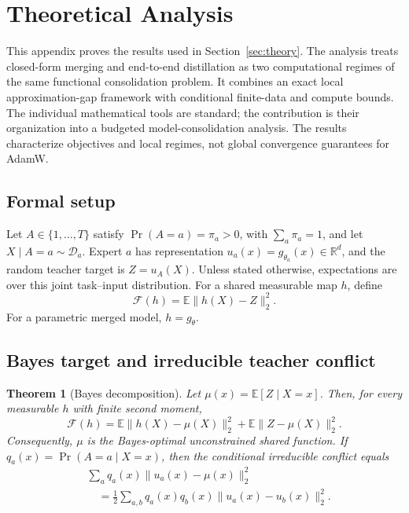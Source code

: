 \documentclass[letterpaper]{article} %
\theoremstyle{plain}
\newtheorem{theorem}{Theorem}
\theoremstyle{definition}
\begin{document}
\section{Theoretical Analysis}
\label{app:theory}

This appendix proves the results used in Section~\ref{sec:theory}. The analysis treats
closed-form merging and end-to-end distillation as two computational regimes of the same
functional consolidation problem. It combines an exact local approximation-gap framework
with conditional finite-data and compute bounds. The individual mathematical tools are
standard; the contribution is their organization into a budgeted model-consolidation
analysis. The results characterize objectives and local regimes, not global convergence
guarantees for AdamW.

\subsection{Formal setup}
Let $A\in\{1,\ldots,T\}$ satisfy $\Pr(A=a)=\pi_a>0$, with
$\sum_a\pi_a=1$, and let $X\mid A=a\sim\mathcal D_a$. Expert $a$ has
representation $u_a(x)=g_{\theta_a}(x)\in\mathbb R^d$, and the random teacher target is
$Z=u_A(X)$. Unless stated otherwise, expectations are over this joint task--input
distribution. For a shared measurable map $h$, define
\begin{equation}
    \mathcal F(h)=\mathbb E\|h(X)-Z\|_2^2.
    \label{eq:appendix-F}
\end{equation}
For a parametric merged model, $h=g_\theta$.

\subsection{Bayes target and irreducible teacher conflict}
\label{app:bayes}

\begin{theorem}[Bayes decomposition]
\label{thm:bayes}
Let $\mu(x)=\mathbb E[Z\mid X=x]$. Then, for every measurable $h$ with finite second
moment,
\begin{equation}
\mathcal F(h)=
\mathbb E\|h(X)-\mu(X)\|_2^2
+\mathbb E\|Z-\mu(X)\|_2^2.
\label{eq:bayes-decomposition}
\end{equation}
Consequently, $\mu$ is the Bayes-optimal unconstrained shared function. If
$q_a(x)=\Pr(A=a\mid X=x)$, then the conditional irreducible conflict equals
\begin{equation}
\begin{aligned}
&\sum_a q_a(x)\|u_a(x)-\mu(x)\|_2^2 \\
&\quad=\frac12\sum_{a,b}q_a(x)q_b(x)
\|u_a(x)-u_b(x)\|_2^2.
\end{aligned}
\label{eq:pairwise-conflict}
\end{equation}
\end{theorem}
\end{document}
